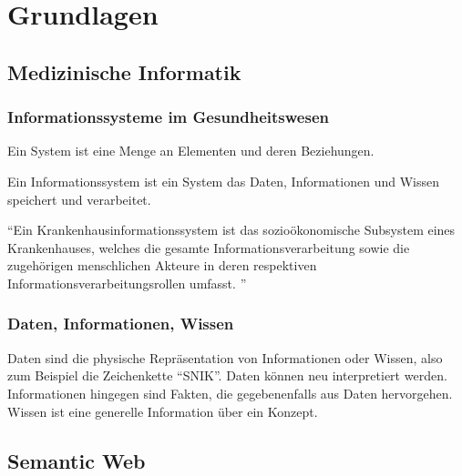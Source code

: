 \chapter{Grundlagen}\label{ch:preliminaries}

\section{Medizinische Informatik}

\subsection{Informationssysteme im Gesundheitswesen}

\begin{definition}[System]
Ein System ist eine Menge an Elementen und deren Beziehungen. \citep[S.~30]{bb}
\end{definition}

\begin{definition}[Informationssystem]
Ein Informationssystem ist ein System das Daten, Informationen und Wissen speichert und verarbeitet. \citep[S.~30]{bb}
\end{definition}

\begin{definition}
\enquote{Ein Krankenhausinformationssystem ist das sozioökonomische Subsystem eines Krankenhauses, welches die gesamte Informationsverarbeitung sowie die zugehörigen menschlichen Akteure in deren respektiven Informationsverarbeitungsrollen umfasst. \citep[S.~37]{bb}}
\end{definition}

\subsection{Daten, Informationen, Wissen}
Daten sind die physische Repräsentation von Informationen oder Wissen, also zum Beispiel die Zeichenkette \enquote{SNIK}. Daten können neu interpretiert werden.
Informationen hingegen sind Fakten, die gegebenenfalls aus Daten hervorgehen.
Wissen ist eine generelle Information über ein Konzept. \citep[S.~29]{bb}

\section{Semantic Web}

